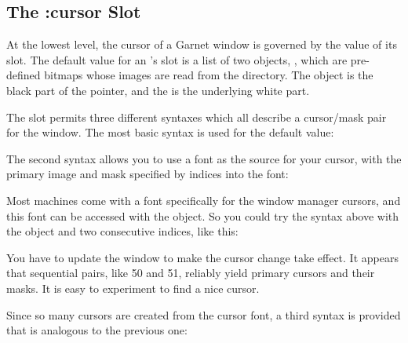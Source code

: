 \begin{group}
\subsection{The :cursor Slot}
\label{the-cursor-slot}

At the lowest level, the cursor of a Garnet window is governed by the value
of its  slot.  The default value for an
's  slot is a list of two objects,
, which are
pre-defined bitmaps whose images are read from the 
directory.  The  object is the black part of the
pointer, and the  is the underlying white part.
\end{group}

\vspace{1 line}
The  slot permits three different syntaxes which all describe
a cursor/mask pair for the window.  The most basic syntax is used for the
default value:


The second syntax allows you to use a font as the source for your cursor,
with the primary image and mask specified by indices into the font:


Most machines come with a font specifically for the window manager cursors,
and this font can be accessed with the  object.
So you could try the syntax above with the  object
and two consecutive indices, like this:


You have to update the window to make the cursor change take effect.
It appears that sequential pairs, like 50 and 51,
reliably yield primary cursors and their masks.
It is easy to experiment to find a nice cursor.

Since so many cursors are created from the cursor font, a third syntax is
provided that is analogous to the previous one:

